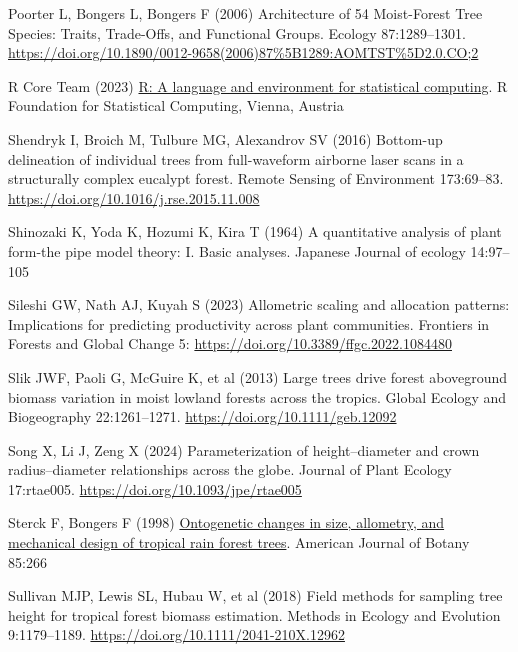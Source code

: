 \documentclass[
  12pt,
  letterpaper,
  DIV=11,
  numbers=noendperiod]{scrartcl}
\newlength{\cslhangindent}
\newlength{\cslentryspacingunit} %
\newenvironment{CSLReferences}[2] %
 {%
  \setlength{\parindent}{0pt}
  \ifodd #1
  \let\oldpar\par
  \def\par{\hangindent=\cslhangindent\oldpar}
  \fi
  \setlength{\parskip}{#2\cslentryspacingunit}
 }%
 {}
\begin{document}
\begin{CSLReferences}{1}{0}
\leavevmode{}%
Poorter L, Bongers L, Bongers F (2006) Architecture of 54
{Moist}-{Forest} {Tree} {Species}: {Traits}, {Trade}-{Offs}, and
{Functional} {Groups}. Ecology 87:1289--1301.
\url{https://doi.org/10.1890/0012-9658(2006)87\%5B1289:AOMTST\%5D2.0.CO;2}

\leavevmode{}%
R Core Team (2023) \href{https://www.R-project.org/}{R: A language and
environment for statistical computing}. R Foundation for Statistical
Computing, Vienna, Austria

\leavevmode{}%
Shendryk I, Broich M, Tulbure MG, Alexandrov SV (2016) Bottom-up
delineation of individual trees from full-waveform airborne laser scans
in a structurally complex eucalypt forest. Remote Sensing of Environment
173:69--83. \url{https://doi.org/10.1016/j.rse.2015.11.008}

\leavevmode{}%
Shinozaki K, Yoda K, Hozumi K, Kira T (1964) A quantitative analysis of
plant form-the pipe model theory: I. Basic analyses. Japanese Journal of
ecology 14:97--105

\leavevmode{}%
Sileshi GW, Nath AJ, Kuyah S (2023) Allometric scaling and allocation
patterns: {Implications} for predicting productivity across plant
communities. Frontiers in Forests and Global Change 5:
\url{https://doi.org/10.3389/ffgc.2022.1084480}

\leavevmode{}%
Slik JWF, Paoli G, McGuire K, et al (2013) Large trees drive forest
aboveground biomass variation in moist lowland forests across the
tropics. Global Ecology and Biogeography 22:1261--1271.
\url{https://doi.org/10.1111/geb.12092}

\leavevmode{}%
Song X, Li J, Zeng X (2024) Parameterization of height--diameter and
crown radius--diameter relationships across the globe. Journal of Plant
Ecology 17:rtae005. \url{https://doi.org/10.1093/jpe/rtae005}

\leavevmode{}%
Sterck F, Bongers F (1998)
\href{https://www.ncbi.nlm.nih.gov/pubmed/21684910}{Ontogenetic changes
in size, allometry, and mechanical design of tropical rain forest
trees}. American Journal of Botany 85:266

\leavevmode{}%
Sullivan MJP, Lewis SL, Hubau W, et al (2018) Field methods for sampling
tree height for tropical forest biomass estimation. Methods in Ecology
and Evolution 9:1179--1189.
\url{https://doi.org/10.1111/2041-210X.12962}


\end{CSLReferences}
\end{document}
